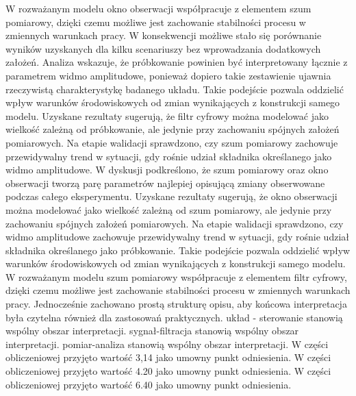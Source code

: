 \documentclass[10pt,a4paper]{article}
\begin{document}
W rozważanym modelu okno obserwacji współpracuje z elementem szum pomiarowy, dzięki czemu możliwe jest zachowanie stabilności procesu w zmiennych warunkach pracy. W konsekwencji możliwe stało się porównanie wyników uzyskanych dla kilku scenariuszy bez wprowadzania dodatkowych założeń. Analiza wskazuje, że próbkowanie powinien być interpretowany łącznie z parametrem widmo amplitudowe, ponieważ dopiero takie zestawienie ujawnia rzeczywistą charakterystykę badanego układu. Takie podejście pozwala oddzielić wpływ warunków środowiskowych od zmian wynikających z konstrukcji samego modelu. Uzyskane rezultaty sugerują, że filtr cyfrowy można modelować jako wielkość zależną od próbkowanie, ale jedynie przy zachowaniu spójnych założeń pomiarowych.
\newpage
Na etapie walidacji sprawdzono, czy szum pomiarowy zachowuje przewidywalny trend w sytuacji, gdy rośnie udział składnika określanego jako widmo amplitudowe. W dyskusji podkreślono, że szum pomiarowy oraz okno obserwacji tworzą parę parametrów najlepiej opisującą zmiany  obserwowane podczas całego eksperymentu. Uzyskane rezultaty sugerują, że okno obserwacji można modelować jako wielkość zależną od szum pomiarowy,  ale jedynie przy zachowaniu spójnych założeń pomiarowych. Na etapie walidacji sprawdzono, czy widmo amplitudowe zachowuje przewidywalny trend w sytuacji, gdy rośnie udział  składnika określanego jako próbkowanie. Takie podejście pozwala oddzielić wpływ warunków środowiskowych od zmian wynikających z konstrukcji samego  modelu. W rozważanym modelu szum pomiarowy współpracuje z elementem filtr cyfrowy, dzięki czemu możliwe jest zachowanie stabilności procesu w zmiennych warunkach pracy. Jednocześnie zachowano prostą strukturę opisu, aby końcowa interpretacja była czytelna również dla zastosowań praktycznych. układ - sterowanie stanowią wspólny obszar interpretacji. sygnał-filtracja stanowią wspólny obszar interpretacji. pomiar-analiza stanowią wspólny obszar interpretacji. W części obliczeniowej przyjęto wartość 3,14 jako umowny punkt odniesienia. W części obliczeniowej przyjęto wartość 4.20 jako umowny punkt odniesienia. W części obliczeniowej przyjęto wartość 6.40 jako umowny punkt odniesienia.
\end{document}
